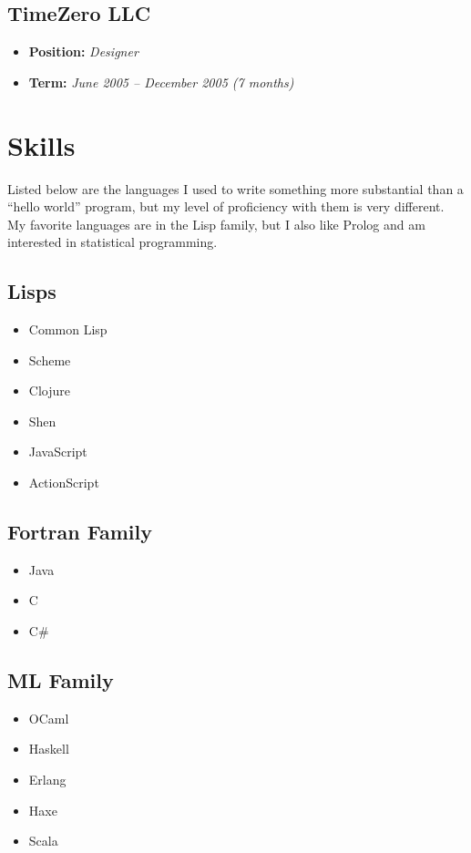 \documentclass[11pt]{article}
\begin{document}
\subsection{TimeZero LLC}
\label{sec-3-8}
\begin{itemize}
\item \textbf{Position:} \emph{Designer}
\item \textbf{Term:} \emph{June 2005 – December 2005 (7 months)}
\end{itemize}
\section{Skills}
\label{sec-4}
Listed below are the languages I used to write something more substantial
than a ``hello world'' program, but my level of proficiency with them is
very different.  My favorite languages are in the Lisp family, but I also
like Prolog and am interested in statistical programming.

\subsection{Lisps}
\label{sec-4-1}
\begin{itemize}
\item Common Lisp
\item Scheme
\item Clojure
\item Shen
\item JavaScript
\item ActionScript
\end{itemize}
\subsection{Fortran Family}
\label{sec-4-2}
\begin{itemize}
\item Java
\item C
\item C\#
\end{itemize}
\subsection{ML Family}
\label{sec-4-3}
\begin{itemize}
\item OCaml
\item Haskell
\item Erlang
\item Haxe
\item Scala
\end{itemize}
\end{document}
